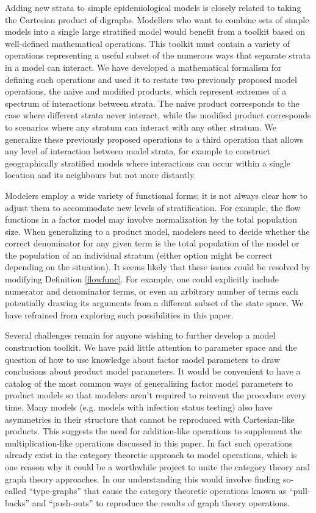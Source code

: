 \documentclass{article}
\theoremstyle{definition}
\begin{document}
Adding new strata to simple epidemiological models is closely related to taking the Cartesian product of digraphs. Modellers who want to combine sets of simple models into a single large stratified model would benefit from a toolkit based on well-defined mathematical operations. This toolkit must contain a variety of operations representing a useful subset of the numerous ways that separate strata in a model can interact. We have developed a mathematical formalism for defining such operations and used it to restate two previously proposed model operations, the naive and modified products, which represent extremes of a spectrum of interactions between strata. The naive product corresponds to the case where different strata never interact, while the modified product corresponds to scenarios where any stratum can interact with any other stratum. We generalize these previously proposed operations to a third operation that allows any level of interaction between model strata, for example to construct geographically stratified models where interactions can occur within a single location and its neighbours but not more distantly.

 Modelers employ a wide variety of functional forms; it is not always clear how to adjust them to accommodate new levels of stratification. For example, the flow functions in a factor model may involve normalization by the total population size. When generalizing to a product model, modelers need to decide whether the correct denominator for any given term is the total population of the model or the population of an individual stratum (either option might be correct depending on the situation). It seems likely that these issues could be resolved by modifying Definition \ref{flowfunc}. For example, one could explicitly include numerator and denominator terms, or even an arbitrary number of terms each potentially drawing its arguments from a different subset of the state space. We have refrained from exploring such possibilities in this paper.

Several challenges remain for anyone wishing to further develop a model construction toolkit. We have paid little attention to parameter space and the question of how to use knowledge about factor model parameters to draw conclusions about product model parameters. It would be convenient to have a catalog of the most common ways of generalizing factor model parameters to product models so that modelers aren't required to reinvent the procedure every time. Many models (e.g. models with infection status testing) also have asymmetries in their structure that cannot be reproduced with Cartesian-like products. This suggests the need for addition-like operations to supplement the multiplication-like operations discussed in this paper. In fact such operations already exist in the category theoretic approach to model operations, which is one reason why it could be a worthwhile project to unite the category theory and graph theory approaches. In our understanding this would involve finding so-called ``type-graphs'' that cause the category theoretic operations known as ``pull-backs'' and ``push-outs'' to  reproduce the results of graph theory operations.
\end{document}
